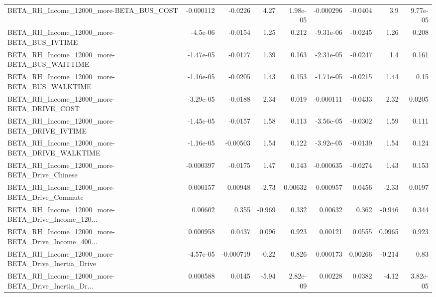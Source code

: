 \begin{tabular}{lrrrrrrrr}
BETA\_RH\_Income\_12000\_more-BETA\_BUS\_COST            &   -0.000112 &      -0.0226 &     4.27 & 1.98e-05 &  -0.000296 &     -0.0404 &          3.9 &      9.77e-05 \\
BETA\_RH\_Income\_12000\_more-BETA\_BUS\_IVTIME          &    -4.5e-06 &      -0.0154 &     1.25 &    0.212 &  -9.31e-06 &     -0.0245 &         1.26 &         0.208 \\
BETA\_RH\_Income\_12000\_more-BETA\_BUS\_WAITTIME        &   -1.47e-05 &      -0.0177 &     1.39 &    0.163 &  -2.31e-05 &     -0.0247 &          1.4 &         0.161 \\
BETA\_RH\_Income\_12000\_more-BETA\_BUS\_WALKTIME        &   -1.16e-05 &      -0.0205 &     1.43 &    0.153 &  -1.71e-05 &     -0.0215 &         1.44 &          0.15 \\
BETA\_RH\_Income\_12000\_more-BETA\_DRIVE\_COST          &   -3.29e-05 &      -0.0188 &     2.34 &    0.019 &  -0.000111 &     -0.0433 &         2.32 &        0.0205 \\
BETA\_RH\_Income\_12000\_more-BETA\_DRIVE\_IVTIME        &   -1.45e-05 &      -0.0157 &     1.58 &    0.113 &  -3.56e-05 &     -0.0302 &         1.59 &         0.111 \\
BETA\_RH\_Income\_12000\_more-BETA\_DRIVE\_WALKTIME      &   -1.16e-05 &     -0.00503 &     1.54 &    0.122 &  -3.92e-05 &     -0.0139 &         1.54 &         0.124 \\
BETA\_RH\_Income\_12000\_more-BETA\_Drive\_Chinese       &   -0.000397 &      -0.0175 &     1.47 &    0.143 &  -0.000635 &     -0.0274 &         1.43 &         0.153 \\
BETA\_RH\_Income\_12000\_more-BETA\_Drive\_Commute       &    0.000157 &      0.00948 &    -2.73 &  0.00632 &   0.000957 &      0.0456 &        -2.33 &        0.0197 \\
BETA\_RH\_Income\_12000\_more-BETA\_Drive\_Income\_120... &     0.00602 &        0.355 &   -0.969 &    0.332 &    0.00632 &       0.362 &       -0.946 &         0.344 \\
BETA\_RH\_Income\_12000\_more-BETA\_Drive\_Income\_400... &    0.000958 &       0.0437 &    0.096 &    0.923 &    0.00121 &      0.0555 &       0.0965 &         0.923 \\
BETA\_RH\_Income\_12000\_more-BETA\_Drive\_Inertia\_Drive &   -4.57e-05 &    -0.000719 &    -0.22 &    0.826 &   0.000173 &     0.00266 &       -0.214 &          0.83 \\
BETA\_RH\_Income\_12000\_more-BETA\_Drive\_Inertia\_Dr... &    0.000588 &       0.0145 &    -5.94 & 2.82e-09 &    0.00228 &      0.0382 &        -4.12 &      3.82e-05 \\

\end{tabular}

